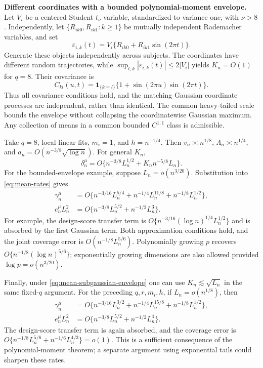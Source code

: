 \documentclass[12pt]{article}
\numberwithin{equation}{section}
\begin{document}
\noindent\textbf{Different coordinates with a bounded polynomial-moment envelope.}
Let $V_i$ be a centered Student $t_\nu$ variable, standardized to
variance one, with $\nu>8$. Independently, let
$\{R_{ik0},R_{ik1}:k\ge1\}$ be mutually independent Rademacher
variables, and set
\[
\varepsilon_{i,k}(t)=V_i\{R_{ik0}+R_{ik1}\sin(2\pi t)\}.
\]
Generate these objects independently across subjects.
The coordinates have different random trajectories, while
$\sup_{t,k}|\varepsilon_{i,k}(t)|\le2|V_i|$ yields $K_n=O(1)$
for $q=8$. Their covariance is
\[
C_{kl}(u,t)=\mathbf1_{\{k=l\}}
\{1+\sin(2\pi u)\sin(2\pi t)\}.
\]
Thus all covariance conditions hold, and the matching Gaussian
coordinate processes are independent, rather than identical.
The common heavy-tailed scale bounds the envelope without collapsing
the coordinatewise Gaussian maximum. Any collection of means in a
common bounded $C^{1,1}$ class is admissible.

Take $q=8$, local linear fits, $m_i=1$, and $h=n^{-1/4}$.
Then $v_n\asymp n^{1/8}$, $\Lambda_n\asymp n^{1/4}$, and
$a_n=O(n^{-3/8}\sqrt{\log n})$. For general $K_n$,
\[
\delta_n^\mu=O\{n^{-3/8}L_n^{1/2}+K_n n^{-5/8}L_n\}.
\]
For the bounded-envelope example, suppose $L_n=o(n^{3/20})$.
Substitution into \eqref{eq:mean-rates} gives
\[
\begin{aligned}
\gamma_n^\mu&=O\{n^{-3/16}L_n^{5/4}
+n^{-1/4}L_n^{11/8}+n^{-1/8}L_n^{1/2}\},\\
e_n^\mu L_n^2&=O\{n^{-3/8}L_n^{5/2}+n^{-1/2}L_n^3\}.
\end{aligned}
\]
For example, the design-score transfer term is
$O\{n^{-3/16}(\log n)^{1/4}L_n^{1/2}\}$ and is absorbed by
the first Gaussian term. Both approximation conditions hold, and
the joint coverage error is $O(n^{-1/8}L_n^{5/6})$.
Polynomially growing $p$ recovers
$O\{n^{-1/8}(\log n)^{5/6}\}$; exponentially growing dimensions
are also allowed provided $\log p=o(n^{3/20})$.

Finally, under \eqref{eq:mean-subgaussian-envelope} one can use
$K_n\lesssim\sqrt{L_n}$ in the same fixed-$q$ argument.
For the preceding $q,r,m_i,h$, if $L_n=o(n^{1/8})$, then
\[
\begin{aligned}
\gamma_n^\mu&=O\{n^{-3/16}L_n^{3/2}
+n^{-1/4}L_n^{15/8}+n^{-1/8}L_n^{1/2}\},\\
e_n^\mu L_n^2&=O\{n^{-3/8}L_n^{5/2}+n^{-1/2}L_n^4\}.
\end{aligned}
\]
The design-score transfer term is again absorbed, and the coverage
error is
$O\{n^{-1/8}L_n^{5/6}+n^{-1/6}L_n^{4/3}\}=o(1)$.
This is a sufficient consequence of the polynomial-moment theorem;
a separate argument using exponential tails could sharpen these rates.
\end{document}
